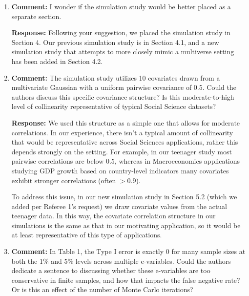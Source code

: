 \documentclass[11pt, a4paper]{article}
\newcommand{\reply}{\vspace{0.3cm} \noindent \textbf{Response:} {\it }}
\begin{document}
\begin{enumerate}[leftmargin=*]
    \reply Done.

    \vspace{0.5cm}

    \item \textbf{Comment:} I wonder if the simulation study would be better placed as a separate section.

    \reply Following your suggestion, we placed the simulation study in Section 4. Our previous simulation study is in Section 4.1, and a new simulation study that attempts to more closely mimic a multiverse setting has been added in Section 4.2.

    \vspace{0.5cm}

    \item \textbf{Comment:} The simulation study utilizes 10 covariates drawn from a multivariate Gaussian with a uniform pairwise covariance of 0.5. Could the authors discuss this specific covariance structure? Is this moderate-to-high level of collinearity representative of typical Social Science datasets?

    \reply We used this structure as a simple one that allows for moderate correlations. In our experience, there isn't a typical amount of collinearity that would be representative across Social Sciences applications, rather this depends strongly on the setting. For example, in our teenager study most pairwise correlations are below 0.5, whereas in Macroeconomics applications studying GDP growth based on country-level indicators many covariates exhibit stronger correlations (often $>0.9$).

To address this issue, in our new simulation study in Section 5.2 (which we added per Referee 1's request) we draw covariate values from the actual teenager data. In this way, the covariate correlation structure in our simulations is the same as that in our motivating application, so it would be at least representative of this type of applications.

    \vspace{0.5cm}

    \item \textbf{Comment:} In Table 1, the Type I error is exactly 0 for many sample sizes at both the 1\% and 5\% levels across multiple e-variables. Could the authors dedicate a sentence to discussing whether these e-variables are too conservative in finite samples, and how that impacts the false negative rate? Or is this an effect of the number of Monte Carlo iterations?


\end{enumerate}
\end{document}
